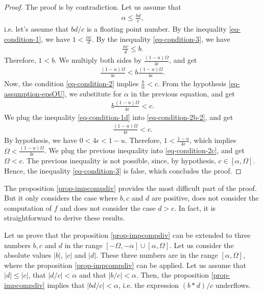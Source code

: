 \documentclass{paper}
\begin{document}
\begin{proof}
The proof is by contradiction. 
Let us assume that
\begin{eqnarray}
\label{eq-condition-3}
            \alpha \leq \frac{bd}{c},
\end{eqnarray}
i.e. let's assume that $bd/c$ is a floating point number. 
By the inequality \ref{eq-condition-1}, we have 
$1 < \frac{\alpha c}{d}$. 
By the inequality \ref{eq-condition-3}, we have 
\begin{eqnarray}
\label{eq-condition-3b}
            \frac{\alpha c}{d} \leq b.
\end{eqnarray}
Therefore, $1 < b$. 
We multiply both sides by $\frac{(1-u)\Omega}{4\epsilon}$, and get
\begin{eqnarray}
\label{eq-condition-1d}
            \frac{(1-u)\Omega}{4\epsilon} < b\frac{(1-u)\Omega}{4\epsilon}. 
\end{eqnarray}
Now, the condition \ref{eq-condition-2} implies 
$\frac{b}{\alpha}< c$.
From the hypothesis \ref{eq-assumption-epsOU}, we substitute 
for $\alpha$ in the previous equation, and get
\begin{eqnarray}
\label{eq-condition-2b-2}
            b\frac{(1-u)\Omega}{4\epsilon}< c.
\end{eqnarray}
We plug the inequality \ref{eq-condition-1d} into  
\ref{eq-condition-2b-2}, and get
\begin{eqnarray}
\label{eq-condition-2c}
            \frac{(1-u)\Omega}{4\epsilon} < c.
\end{eqnarray}
By hypothesis, we have $0< 4\epsilon<1-u$. 
Therefore, $1<\frac{1-u}{4\epsilon}$, 
which implies $\Omega < \frac{(1-u)\Omega}{4\epsilon}$. 
We plug the previous inequality into \ref{eq-condition-2c}, and get
$\Omega < c$.
The previous inequality is not possible, since, by hypothesis, 
$c \in[\alpha,\Omega]$. 
Hence, the inequality \ref{eq-condition-3} is false, 
which concludes the proof.
\end{proof}

The proposition \ref{prop-impcompdiv} provides the most difficult 
part of the proof. 
But it only considers the case where $b,c$ and $d$ are positive, 
does not consider the computation of $f$ and 
does not consider the case $d>c$.
In fact, it is straightforward to derive these results. 

Let us prove that the proposition \ref{prop-impcompdiv} 
can be extended to three numbers $b,c$ and $d$ in the range $[-\Omega,-\alpha]\cup [\alpha,\Omega]$. 
Let us consider the absolute values $|b|$, $|c|$ and $|d|$. 
These three numbers are in the range $[\alpha,\Omega]$, where the proposition 
\ref{prop-impcompdiv} can be applied. 
Let us assume that $|d|\leq |c|$, that $|d/c| < \alpha$ and that 
$|b/c|< \alpha$. 
Then, the proposition \ref{prop-impcompdiv} implies that 
$|bd/c|<\alpha$, i.e. the expression $(b*d)/c$ underflows.
\end{document}
